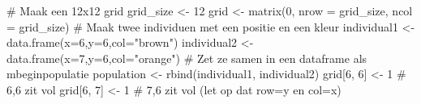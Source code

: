 \documentclass[
  a4paper,
]{scrbook}
\newenvironment{Shaded}{\begin{snugshade}}{\end{snugshade}}
\newcommand{\AttributeTok}[1]{\textcolor[rgb]{0.40,0.45,0.13}{#1}}
\newcommand{\CommentTok}[1]{\textcolor[rgb]{0.37,0.37,0.37}{#1}}
\newcommand{\DecValTok}[1]{\textcolor[rgb]{0.68,0.00,0.00}{#1}}
\newcommand{\FunctionTok}[1]{\textcolor[rgb]{0.28,0.35,0.67}{#1}}
\newcommand{\NormalTok}[1]{\textcolor[rgb]{0.00,0.23,0.31}{#1}}
\newcommand{\OtherTok}[1]{\textcolor[rgb]{0.00,0.23,0.31}{#1}}
\newcommand{\StringTok}[1]{\textcolor[rgb]{0.13,0.47,0.30}{#1}}
\theoremstyle{definition}
\theoremstyle{remark}
\begin{document}
\begin{Shaded}
\begin{Highlighting}[]
\CommentTok{\# Maak een 12x12 grid}
\NormalTok{grid\_size }\OtherTok{\textless{}{-}} \DecValTok{12}
\NormalTok{grid }\OtherTok{\textless{}{-}} \FunctionTok{matrix}\NormalTok{(}\DecValTok{0}\NormalTok{, }\AttributeTok{nrow =}\NormalTok{ grid\_size, }\AttributeTok{ncol =}\NormalTok{ grid\_size)}
\CommentTok{\# Maak twee individuen met een positie en een kleur}
\NormalTok{individual1 }\OtherTok{\textless{}{-}} \FunctionTok{data.frame}\NormalTok{(}\AttributeTok{x=}\DecValTok{6}\NormalTok{,}\AttributeTok{y=}\DecValTok{6}\NormalTok{,}\AttributeTok{col=}\StringTok{"brown"}\NormalTok{)}
\NormalTok{individual2 }\OtherTok{\textless{}{-}} \FunctionTok{data.frame}\NormalTok{(}\AttributeTok{x=}\DecValTok{7}\NormalTok{,}\AttributeTok{y=}\DecValTok{6}\NormalTok{,}\AttributeTok{col=}\StringTok{"orange"}\NormalTok{)}
\CommentTok{\# Zet ze samen in een dataframe als \textquotesingle{}mbeginpopulatie\textquotesingle{}}
\NormalTok{population }\OtherTok{\textless{}{-}} \FunctionTok{rbind}\NormalTok{(individual1, individual2)}
\NormalTok{grid[}\DecValTok{6}\NormalTok{, }\DecValTok{6}\NormalTok{] }\OtherTok{\textless{}{-}} \DecValTok{1} \CommentTok{\# 6,6 zit vol}
\NormalTok{grid[}\DecValTok{6}\NormalTok{, }\DecValTok{7}\NormalTok{] }\OtherTok{\textless{}{-}} \DecValTok{1} \CommentTok{\# 7,6 zit vol (let op dat row=y en col=x)}


\end{Highlighting}
\end{Shaded}
\end{document}
